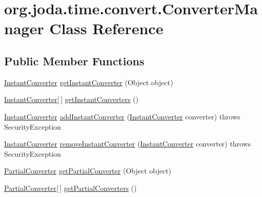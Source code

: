\hypertarget{classorg_1_1joda_1_1time_1_1convert_1_1_converter_manager}{\section{org.\-joda.\-time.\-convert.\-Converter\-Manager Class Reference}
\label{classorg_1_1joda_1_1time_1_1convert_1_1_converter_manager}
}
\subsection*{Public Member Functions}
\begin{DoxyCompactItemize}
\item 
\hyperlink{interfaceorg_1_1joda_1_1time_1_1convert_1_1_instant_converter}{Instant\-Converter} \hyperlink{classorg_1_1joda_1_1time_1_1convert_1_1_converter_manager_a38268fcac7fb82d07151f0ecf573617a}{get\-Instant\-Converter} (Object object)
\item 
\hyperlink{interfaceorg_1_1joda_1_1time_1_1convert_1_1_instant_converter}{Instant\-Converter}\mbox{[}$\,$\mbox{]} \hyperlink{classorg_1_1joda_1_1time_1_1convert_1_1_converter_manager_ad468d8896e0ba7310f9d34e5720db83b}{get\-Instant\-Converters} ()
\item 
\hyperlink{interfaceorg_1_1joda_1_1time_1_1convert_1_1_instant_converter}{Instant\-Converter} \hyperlink{classorg_1_1joda_1_1time_1_1convert_1_1_converter_manager_a70505c21c83894de02f210c81f2fada3}{add\-Instant\-Converter} (\hyperlink{interfaceorg_1_1joda_1_1time_1_1convert_1_1_instant_converter}{Instant\-Converter} converter)  throws Security\-Exception 
\item 
\hyperlink{interfaceorg_1_1joda_1_1time_1_1convert_1_1_instant_converter}{Instant\-Converter} \hyperlink{classorg_1_1joda_1_1time_1_1convert_1_1_converter_manager_a5fdf6c1d7eb99ff3c0061d23ff80c07b}{remove\-Instant\-Converter} (\hyperlink{interfaceorg_1_1joda_1_1time_1_1convert_1_1_instant_converter}{Instant\-Converter} converter)  throws Security\-Exception 
\item 
\hyperlink{interfaceorg_1_1joda_1_1time_1_1convert_1_1_partial_converter}{Partial\-Converter} \hyperlink{classorg_1_1joda_1_1time_1_1convert_1_1_converter_manager_ae5da7d88ad2a4d2a5ebc0b4064c8f53e}{get\-Partial\-Converter} (Object object)
\item 
\hyperlink{interfaceorg_1_1joda_1_1time_1_1convert_1_1_partial_converter}{Partial\-Converter}\mbox{[}$\,$\mbox{]} \hyperlink{classorg_1_1joda_1_1time_1_1convert_1_1_converter_manager_a3f97b4d93259d3fc1a4e72c8f98394b3}{get\-Partial\-Converters} ()

\end{DoxyCompactItemize}
